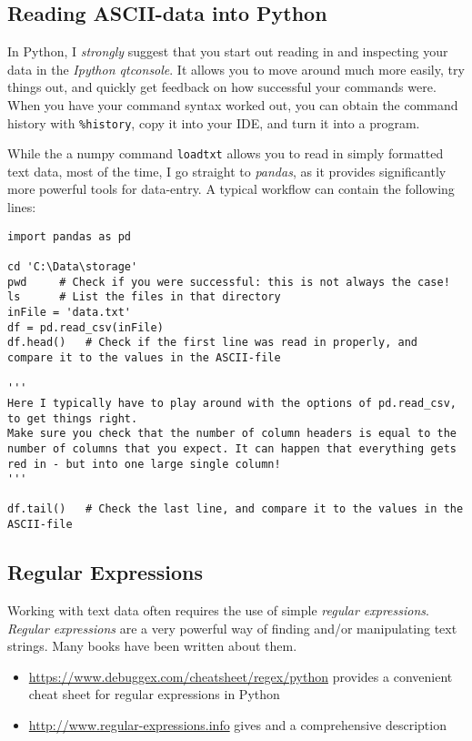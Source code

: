 \subsection{Reading ASCII-data into Python}

In Python, I \emph{strongly} suggest that you start out reading in and inspecting your data in the \emph{Ipython qtconsole}. It allows you to move around much more easily, try things out, and quickly get feedback on how successful your commands were. When you have your command syntax worked out, you can obtain the command history with \lstinline{%history}, copy it into your IDE, and turn it into a program.

While the a numpy command \lstinline{loadtxt} allows you to read in simply formatted text data, most of the time, I go straight to \emph{pandas}, as it provides significantly more powerful tools for data-entry. A typical workflow can contain the following lines:

\begin{lstlisting}
import pandas as pd

cd 'C:\Data\storage'
pwd     # Check if you were successful: this is not always the case!
ls      # List the files in that directory
inFile = 'data.txt'
df = pd.read_csv(inFile)
df.head()   # Check if the first line was read in properly, and compare it to the values in the ASCII-file

'''
Here I typically have to play around with the options of pd.read_csv, to get things right.
Make sure you check that the number of column headers is equal to the number of columns that you expect. It can happen that everything gets red in - but into one large single column!
'''

df.tail()   # Check the last line, and compare it to the values in the ASCII-file
\end{lstlisting}

\subsection{Regular Expressions}

Working with text data often requires the use of simple \emph{regular expressions}. \emph{Regular expressions} are a very powerful way of finding and/or manipulating text strings. Many books have been written about them.

\begin{itemize}
  \item \url{https://www.debuggex.com/cheatsheet/regex/python} provides a convenient cheat sheet for regular expressions in Python
  \item \url{http://www.regular-expressions.info} gives and a comprehensive description
\end{itemize}


